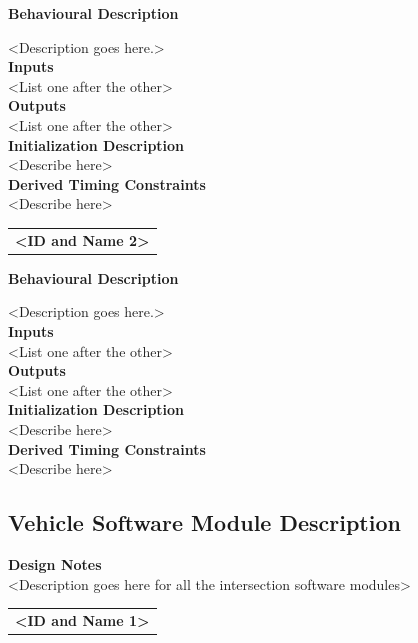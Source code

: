 \documentclass [10pt]{article}
\begin{document}
\textbf{Behavioural Description} 

<Description goes here.> \\

\textbf{Inputs} \\
<List one after the other> \\

\textbf{Outputs} \\
<List one after the other> \\

\textbf{Initialization Description} \\
<Describe here> \\

\textbf{Derived Timing Constraints} \\
<Describe here> \\


\begin{longtable}{p{}}
\rowcolor{tableCell}\textbf{<ID and Name 2>} \\
\end{longtable}

\textbf{Behavioural Description} 

<Description goes here.> \\

\textbf{Inputs} \\
<List one after the other> \\

\textbf{Outputs} \\
<List one after the other> \\

\textbf{Initialization Description} \\
<Describe here> \\

\textbf{Derived Timing Constraints} \\
<Describe here> \\


\subsection{Vehicle Software Module Description}

\textbf{Design Notes} \\
<Description goes here for all the intersection software modules> \\

\begin{longtable}{p{}}
\rowcolor{tableCell}\textbf{<ID and Name 1>} \\
\end{longtable}
\end{document}

